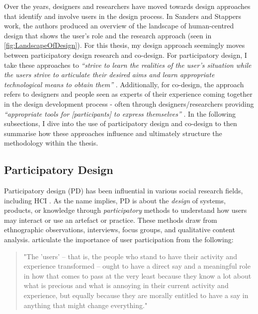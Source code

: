 Over the years, designers and researchers have moved towards design approaches that identify and involve users in the design process. In Sanders and Stappers work, the authors produced an overview of the landscape of human-centred design that shows the user's role and the research approach (seen in \ref{fig:LandscapeOfDesign}). For this thesis, my design approach seemingly moves between participatory design research and co-design. For participatory design, I take these approaches to \textit{``strive to learn the realities of the user's situation while the users strive to articulate their desired aims and learn appropriate technological means to obtain them''} \citep{simonsen2013routledge}. Additionally, for co-design, the approach refers to designers and people seen as experts of their experience coming together in the design development process - often through designers/researchers providing \textit{``appropriate tools for [participants] to express themselves''} \citep{sanders2008co}. In the following subsections, I dive into the use of participatory design and co-design to then summarise how these approaches influence and ultimately structure the methodology within the thesis.

\subsection{Participatory Design}
\label{Method:PD}
Participatory design (PD) has been influential in various social research fields, including HCI \citep{bannon2018introduction}. As the name implies, PD is about the \textit{design} of systems, products, or knowledge through \textit{participatory} methods to understand how users may interact or use an artefact or practice. These methods draw from ethnographic observations, interviews, focus groups, and qualitative content analysis. \cite{carroll2007participatory} articulate the importance of user participation from the following:

\begin{quote}
"The 'users' – that is, the people who stand to have their activity and experience transformed – ought to have a direct say and a meaningful role in how that comes to pass at the very least because they know a lot about what is precious and what is annoying in their current activity and experience, but equally because they are morally entitled to have a say in anything that might change everything." \citep{carroll2007participatory}    
\end{quote}

